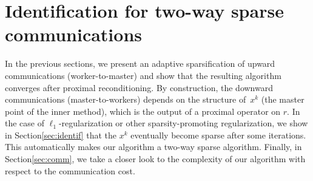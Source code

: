 \section{Identification for two-way sparse communications}\label{sec:spy-identification}

In the previous sections, we present an adaptive sparsification of upward communications (worker-to-master) and show that the resulting algorithm converges after proximal reconditioning. By construction, the downward communications (master-to-workers) depends on the structure of~$x^k$ (the master point of the inner method), which is the output of a proximal operator on $r$. In the case of $\ell_1$-regularization or other sparsity-promoting regularization\;\cite{bach2012optimization}, we show in Section\;\ref{sec:identif} that the $x^k$ eventually become sparse after some iterations. This automatically makes our algorithm a two-way sparse algorithm. 
Finally, in Section\;\ref{sec:comm}, we take a closer look to the complexity of our algorithm with respect to the communication cost.

